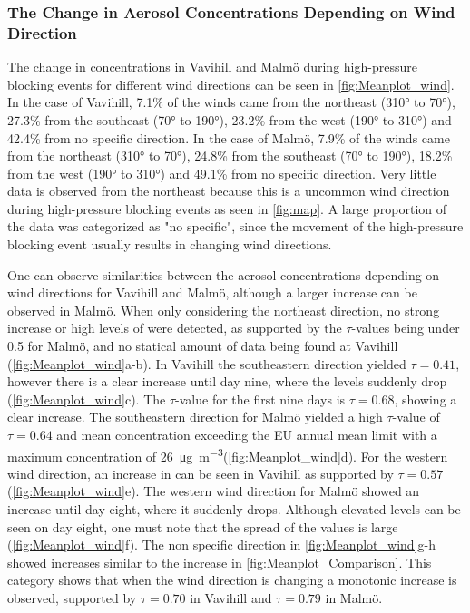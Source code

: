 \subsubsection{The Change in Aerosol Concentrations Depending on Wind Direction}

The change in \PM concentrations in Vavihill and Malmö during high-pressure blocking events for different wind directions can be seen in \autoref{fig:Meanplot_wind}. In the case of Vavihill, 7.1\% of the winds came from the northeast (310° to 70°), 27.3\% from the southeast (70° to 190°), 23.2\% from the west (190° to 310°) and 42.4\% from no specific direction. In the case of Malmö, 7.9\% of the winds came from the northeast (310° to 70°), 24.8\% from the southeast (70° to 190°), 18.2\% from the west (190° to 310°) and 49.1\% from no specific direction. Very little data is observed from the northeast because this is a uncommon wind direction during high-pressure blocking events as seen in \autoref{fig:map}. A large proportion of the data was categorized as "no specific", since the movement of the high-pressure blocking event usually results in changing wind directions. 


One can observe similarities between the aerosol concentrations depending on wind directions for Vavihill and Malmö, although a larger increase can be observed in Malmö. When only considering the northeast direction, no strong increase or high levels of \PM were detected, as supported by the $\tau$-values being under 0.5 for Malmö, and no statical amount of data being found at Vavihill (\autoref{fig:Meanplot_wind}a-b). In Vavihill the southeastern direction yielded $\tau=0.41$, however there is a clear increase until day nine, where the levels suddenly drop (\autoref{fig:Meanplot_wind}c). The $\tau$-value for the first nine days is $\tau=0.68$, showing a clear increase. The southeastern direction for Malmö yielded a high $\tau$-value of $\tau=0.64$ and mean concentration exceeding the EU annual mean limit with a maximum concentration of \SI{26}{\micro\gram\per\meter\cubed}(\autoref{fig:Meanplot_wind}d). For the western wind direction, an increase in \PM can be seen in Vavihill as supported by $\tau=0.57$ (\autoref{fig:Meanplot_wind}e). The western wind direction for Malmö showed an increase until day eight, where it suddenly drops. Although elevated levels can be seen on day eight, one must note that the spread of the values is large (\autoref{fig:Meanplot_wind}f). The non specific direction in \autoref{fig:Meanplot_wind}g-h showed increases similar to the increase in \autoref{fig:Meanplot_Comparison}. This category shows that when the wind direction is changing a monotonic increase is observed, supported by $\tau=0.70$ in Vavihill and $\tau=0.79$ in Malmö. 

